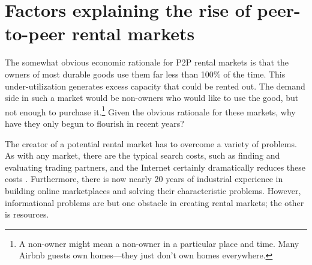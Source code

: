 \documentclass[11pt]{article}
\begin{document}
 



\section{Factors explaining the rise of peer-to-peer rental markets}

The somewhat obvious economic rationale for P2P rental markets is that the owners of most durable goods use them far less than 100\% of the time.
This under-utilization generates excess capacity that could be rented out.
The demand side in such a market would be non-owners who would like to use the good, but not enough to purchase it.\footnote{
A non-owner might mean a non-owner in a particular place and time. 
Many Airbnb guests own homes---they just don't own homes everywhere. 
} 
Given the obvious rationale for these markets, why have they only begun to flourish in recent years? 

The creator of a potential rental market has to overcome a variety of problems. 
As with any market, there are the typical search costs, such as finding and evaluating trading partners, and the Internet certainly dramatically reduces these costs \citep{bakos1997reducing}.
Furthermore, there is now nearly 20 years of industrial experience in building online marketplaces and solving their characteristic problems. 
However, informational problems are but one obstacle in creating rental markets; the other is resources. 

\end{document}

